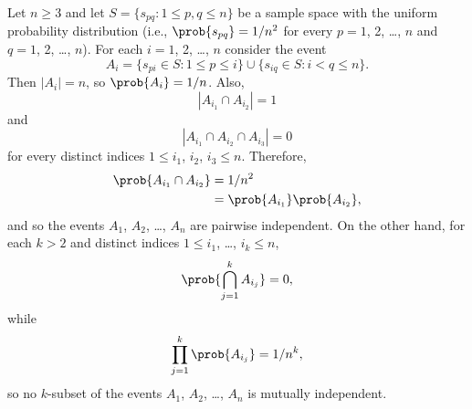 Let $n\ge3$ and let $S=\{s_{pq}:1\le p,q\le n\}$ be a sample space with the uniform probability distribution (i.e., $\prob{s_{pq}}=1/n^2$ for every $p=1$, 2, \dots, $n$ and $q=1$, 2, \dots, $n$).
For each $i=1$, 2, \dots, $n$ consider the event
\[
    A_i = \{s_{pi}\in S:1\le p\le i\}\cup\{s_{iq}\in S:i<q\le n\}.
\]
Then $|A_i|=n$, so $\prob{A_i}=1/n$.
Also,
\[
    |A_{i_1}\cap A_{i_2}| = 1
\]
and
\[
    |A_{i_1}\cap A_{i_2}\cap A_{i_3}| = 0
\]
for every distinct indices $1\le i_1$, $i_2$, $i_3\le n$.
Therefore,
\begin{align*}
    \prob{A_{i_1}\cap A_{i_2}} &= 1/n^2 \\
    &= \prob{A_{i_1}}\prob{A_{i_2}},
\end{align*}
and so the events $A_1$, $A_2$, \dots, $A_n$ are pairwise independent.
On the other hand, for each $k>2$ and distinct indices $1\le i_1$, \dots, $i_k\le n$,
\[
    \prob{\bigcap_{j=1}^kA_{i_j}} = 0,
\]
while
\[
    \prod_{j=1}^k\prob{A_{i_j}} = 1/n^k,
\]
so no $k$-subset of the events $A_1$, $A_2$, \dots, $A_n$ is mutually independent.
